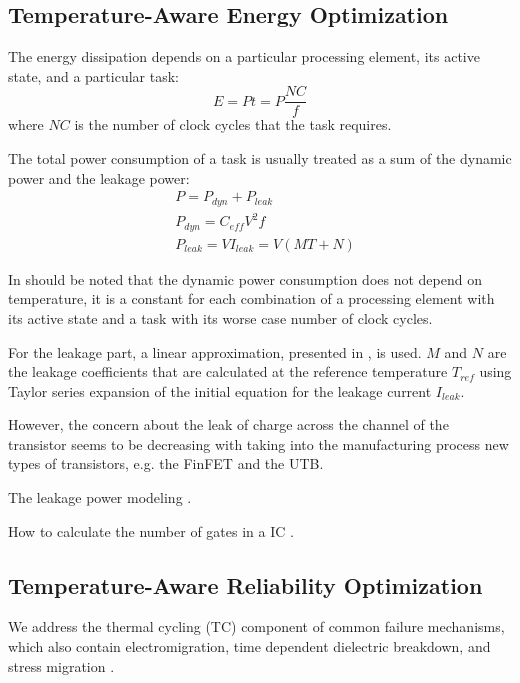 \subsection{Temperature-Aware Energy Optimization}
The energy dissipation depends on a particular processing element, its active state, and a particular task:
\[
  E = P t = P \frac{NC}{f}
\]
where $NC$ is the number of clock cycles that the task requires.

The total power consumption of a task is usually treated as a sum of the dynamic power and the leakage power:
\begin{align*}
  & P = P_{dyn} + P_{leak} \\
  & P_{dyn} = C_{eff} V^2 f \\
  & P_{leak} = V I_{leak} = V (MT + N)
\end{align*}

In should be noted that the dynamic power consumption does not depend on temperature, it is a constant for each combination of a processing element with its active state and a task with its worse case number of clock cycles.

For the leakage part, a linear approximation, presented in \cite{liu2007}, is used. $M$ and $N$ are the leakage coefficients that are calculated at the reference temperature $T_{ref}$ using Taylor series expansion of the initial equation for the leakage current $I_{leak}$.

However, the concern about the leak of charge across the channel of the transistor seems to be decreasing with taking into the manufacturing process new types of transistors, e.g. the FinFET and the UTB.



The leakage power modeling \cite{liao2005}.

How to calculate the number of gates in a IC \cite{li2004}.


\subsection{Temperature-Aware Reliability Optimization}
We address the thermal cycling (TC) component of common failure mechanisms, which also contain electromigration, time dependent dielectric breakdown, and stress migration \cite{xiang2010}.

